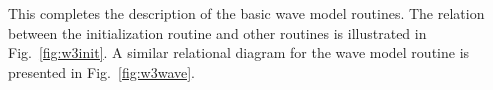 \noindent
This completes the description of the basic wave model routines. The relation
between the initialization routine and other routines is illustrated in
Fig.~\ref{fig:w3init}. %
A similar relational
diagram for the wave model routine is presented in Fig.~\ref{fig:w3wave}. 
   




